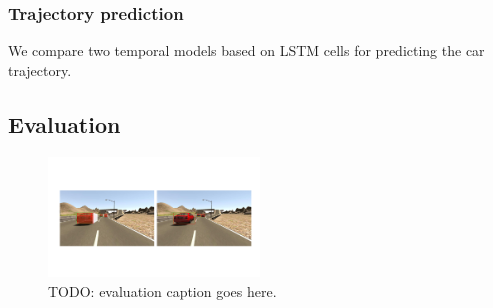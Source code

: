 \documentclass[10pt,twocolumn,letterpaper]{article}
\begin{document}
\subsubsection{Trajectory prediction}

We compare two temporal models based on LSTM cells for predicting the car trajectory.



\subsection{Evaluation}
\begin{figure}[t]
        \centering
        \includegraphics[width=0.5\textwidth]{figures/evaluation.pdf}
        \caption{ {\small TODO: evaluation caption goes here.}}
        \label{fig:evaluation}
\end{figure}
\end{document}

